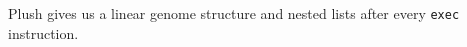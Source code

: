Plush gives us a linear genome structure and nested lists after every \texttt{exec}
instruction.





